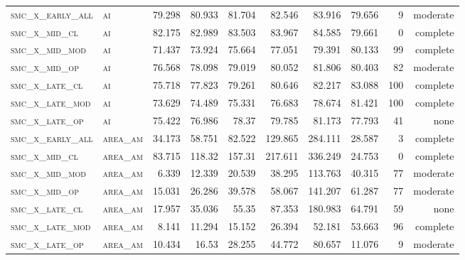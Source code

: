 \begin{landscape}
\begin{center}
\begin{footnotesize}
\begin{longtable}{llrrrrr|rrr}
\textsc{smc\_x\_early\_all} & \textsc{ai        }   & 79.298     & 80.933     & 81.704     & 82.546     & 83.916     & 79.656     & 9     & moderate   \\
\textsc{smc\_x\_mid\_cl   } & \textsc{ai        }   & 82.175     & 82.989     & 83.503     & 83.967     & 84.585     & 79.661     & 0     & complete   \\
\textsc{smc\_x\_mid\_mod  } & \textsc{ai        }   & 71.437     & 73.924     & 75.664     & 77.051     & 79.391     & 80.133     & 99    & complete   \\
\textsc{smc\_x\_mid\_op   } & \textsc{ai        }   & 76.568     & 78.098     & 79.019     & 80.052     & 81.806     & 80.403     & 82    & moderate   \\
\textsc{smc\_x\_late\_cl  } & \textsc{ai        }   & 75.718     & 77.823     & 79.261     & 80.646     & 82.217     & 83.088     & 100   & complete   \\
\textsc{smc\_x\_late\_mod } & \textsc{ai        }   & 73.629     & 74.489     & 75.331     & 76.683     & 78.674     & 81.421     & 100   & complete   \\
\textsc{smc\_x\_late\_op  } & \textsc{ai        }   & 75.422     & 76.986     & 78.37      & 79.785     & 81.173     & 77.793     & 41    & none   \\
\textsc{smc\_x\_early\_all} & \textsc{area\_am  }   & 34.173     & 58.751     & 82.522     & 129.865    & 284.111    & 28.587     & 3     & complete   \\
\textsc{smc\_x\_mid\_cl   } & \textsc{area\_am  }   & 83.715     & 118.32     & 157.31     & 217.611    & 336.249    & 24.753     & 0     & complete   \\
\textsc{smc\_x\_mid\_mod  } & \textsc{area\_am  }   & 6.339      & 12.339     & 20.539     & 38.295     & 113.763    & 40.315     & 77    & moderate   \\
\textsc{smc\_x\_mid\_op   } & \textsc{area\_am  }   & 15.031     & 26.286     & 39.578     & 58.067     & 141.207    & 61.287     & 77    & moderate   \\
\textsc{smc\_x\_late\_cl  } & \textsc{area\_am  }   & 17.957     & 35.036     & 55.35      & 87.353     & 180.983    & 64.791     & 59    & none   \\
\textsc{smc\_x\_late\_mod } & \textsc{area\_am  }   & 8.141      & 11.294     & 15.152     & 26.394     & 52.181     & 53.663     & 96    & complete   \\
\textsc{smc\_x\_late\_op  } & \textsc{area\_am  }   & 10.434     & 16.53      & 28.255     & 44.772     & 80.657     & 11.076     & 9     & moderate   \\

\end{longtable}
\end{footnotesize}
\end{center}
\end{landscape}

